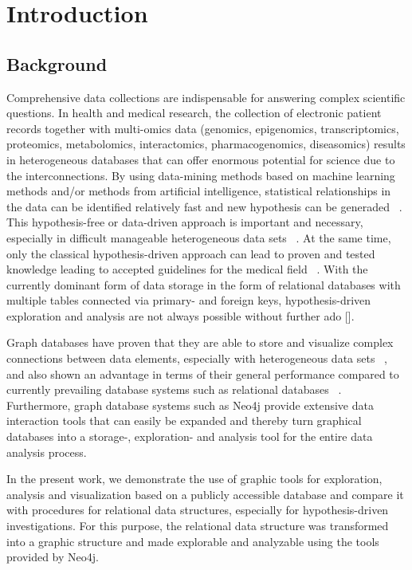 \documentclass[aac]{iosart2x}
\begin{document}

\section{Introduction}\label{s1}

\subsection{Background}\label{s1.1}
\noindent Comprehensive data collections are indispensable for answering complex scientific questions. In health and medical research, the collection of electronic patient records together with multi-omics data (genomics, epigenomics, transcriptomics, proteomics, metabolomics, interactomics, pharmacogenomics, diseasomics) results in heterogeneous databases that can offer enormous potential for science due to the interconnections. By using data-mining methods based on machine learning methods and/or methods from artificial intelligence, statistical relationships in the data can be identified relatively fast and new hypothesis can be generaded ~\cite{Hulsen.2019,Vlachavas.2021}. This hypothesis-free or data-driven approach is important and necessary, especially in difficult manageable heterogeneous data sets ~\cite{Lysenko.2016, Golub.2010}. At the same time, only the classical hypothesis-driven approach can lead to proven and tested knowledge leading to accepted guidelines for the medical field ~\cite{Lysenko.2016, Cirillo.2019, Weinberg.2010}. With the currently dominant form of data storage in the form of relational databases with multiple tables connected via primary- and foreign keys, hypothesis-driven exploration and analysis are not always possible without further ado [].

Graph databases have proven that they are able to store and visualize complex connections between data elements, especially with heterogeneous data sets ~\cite{Fabregat.2018,Himmelstein.2015}, and also shown an advantage in terms of their general performance compared to currently prevailing database systems such as relational databases ~\cite{Lysenko.2016}. Furthermore, graph database systems such as Neo4j provide extensive data interaction tools that can easily be expanded and thereby turn graphical databases into a storage-, exploration- and analysis tool for the entire data analysis process.

In the present work, we demonstrate the use of graphic tools for exploration, analysis and visualization based on a publicly accessible database and compare it with procedures for relational data structures, especially for hypothesis-driven investigations. For this purpose, the relational data structure was transformed into a graphic structure and made explorable and analyzable using the tools provided by Neo4j. 
\end{document}
